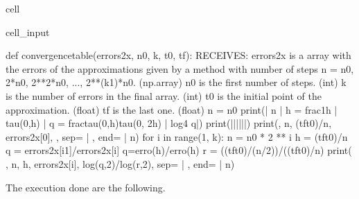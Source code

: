 \documentclass[letterpaper,10pt,english]{jupyterBook}
\begin{document}
\begin{sphinxuseclass}{cell}
\begin{sphinxVerbatimInput}
\begin{sphinxuseclass}{cell_input}
\begin{sphinxVerbatim}[commandchars=\\\{\}]
def convergence\PYGZus{}table(errors\PYGZus{}2x, n0, k, t0, tf):
  \PYGZsq{}\PYGZsq{}\PYGZsq{}
  RECEIVES:
  errors\PYGZus{}2x is a array with the errors of the approximations given
  by a method with number of steps n = n0, 2*n0, 2**2*n0, ..., 2**(k\PYGZhy{}1)*n0. (np.array)
  n0 is the first number of steps. (int)
  k is the number of errors in the final array. (int)
  t0 is the initial point of the approximation. (float)
  tf is the last one. (float)
  \PYGZsq{}\PYGZsq{}\PYGZsq{}
  n = n0
  print(\PYGZdq{}| n | h = \PYGZdl{}\PYGZbs{}\PYGZbs{}frac\PYGZob{}1\PYGZcb{}\PYGZob{}h\PYGZcb{}\PYGZdl{} | \PYGZdl{}\PYGZbs{}\PYGZbs{}tau(0,h)\PYGZdl{} | q = \PYGZdl{}\PYGZbs{}\PYGZbs{}frac\PYGZob{}tau(0,h)\PYGZcb{}\PYGZob{}tau(0, 2h)\PYGZcb{}\PYGZdl{} | \PYGZdl{}log\PYGZus{}4 \PYGZca{}q\PYGZdl{}|\PYGZdq{})
  print(\PYGZdq{}|\PYGZhy{}\PYGZhy{}\PYGZhy{}|\PYGZhy{}\PYGZhy{}\PYGZhy{}\PYGZhy{}\PYGZhy{}\PYGZhy{}\PYGZhy{}\PYGZhy{}\PYGZhy{}\PYGZhy{}\PYGZhy{}\PYGZhy{}\PYGZhy{}\PYGZhy{}\PYGZhy{}\PYGZhy{}\PYGZhy{}|\PYGZhy{}\PYGZhy{}\PYGZhy{}\PYGZhy{}\PYGZhy{}\PYGZhy{}\PYGZhy{}\PYGZhy{}\PYGZhy{}\PYGZhy{}\PYGZhy{}|\PYGZhy{}\PYGZhy{}\PYGZhy{}\PYGZhy{}\PYGZhy{}\PYGZhy{}\PYGZhy{}\PYGZhy{}\PYGZhy{}\PYGZhy{}\PYGZhy{}\PYGZhy{}\PYGZhy{}\PYGZhy{}\PYGZhy{}\PYGZhy{}\PYGZhy{}\PYGZhy{}\PYGZhy{}\PYGZhy{}\PYGZhy{}\PYGZhy{}\PYGZhy{}\PYGZhy{}\PYGZhy{}\PYGZhy{}\PYGZhy{}\PYGZhy{}\PYGZhy{}\PYGZhy{}\PYGZhy{}\PYGZhy{}\PYGZhy{}|\PYGZhy{}\PYGZhy{}\PYGZhy{}\PYGZhy{}\PYGZhy{}\PYGZhy{}\PYGZhy{}|\PYGZdq{})
  print(\PYGZdq{}\PYGZdq{}, n, (tf\PYGZhy{}t0)/n, errors\PYGZus{}2x[0], \PYGZdq{}\PYGZhy{}\PYGZdq{}, sep=\PYGZdq{} | \PYGZdq{}, end=\PYGZdq{} | \PYGZbs{}n\PYGZdq{})
  for i in range(1, k):
      n = n0 * 2 ** i
      h = (tf\PYGZhy{}t0)/n
      q = errors\PYGZus{}2x[i\PYGZhy{}1]/errors\PYGZus{}2x[i] \PYGZsh{}q=erro(h)/erro(h)
      r = ((tf\PYGZhy{}t0)/(n/2))/((tf\PYGZhy{}t0)/n)
      print( \PYGZdq{}\PYGZdq{}, n, h, errors\PYGZus{}2x[i], log(q,2)/log(r,2), sep=\PYGZdq{} | \PYGZdq{}, end=\PYGZdq{} | \PYGZbs{}n\PYGZdq{})
\end{sphinxVerbatim}

\end{sphinxuseclass}\end{sphinxVerbatimInput}

\end{sphinxuseclass}
\sphinxAtStartPar
The execution done are the following.
\end{document}
